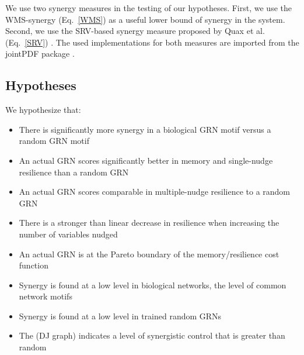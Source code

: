 \documentclass[../main.tex]{subfiles}
\begin{document}
We use two synergy measures in the testing of our hypotheses.
First, we use the WMS-synergy (Eq.~\ref{WMS}) as a useful lower bound of synergy in the system.
Second, we use the SRV-based synergy measure proposed by Quax et al. (Eq.~\ref{SRV}) \cite{quax2017quantifying}.
The used implementations for both measures are imported from the jointPDF package \cite{jointpdf}.

\subsection{Hypotheses}

We hypothesize that:

\begin{itemize}
\item There is significantly more synergy in a biological GRN motif versus a random GRN motif
\item An actual GRN scores significantly better in memory and single-nudge resilience than a random GRN
\item An actual GRN scores comparable in multiple-nudge resilience to a random GRN
\item There is a stronger than linear decrease in resilience when increasing the number of variables nudged
\item An actual GRN is at the Pareto boundary of the memory/resilience cost function
\item Synergy is found at a low level in biological networks, the level of common network motifs 
\item Synergy is found at a low level in trained random GRNs
\item The (DJ graph) indicates a level of synergistic control that is greater than random
\end{itemize}
\end{document}

